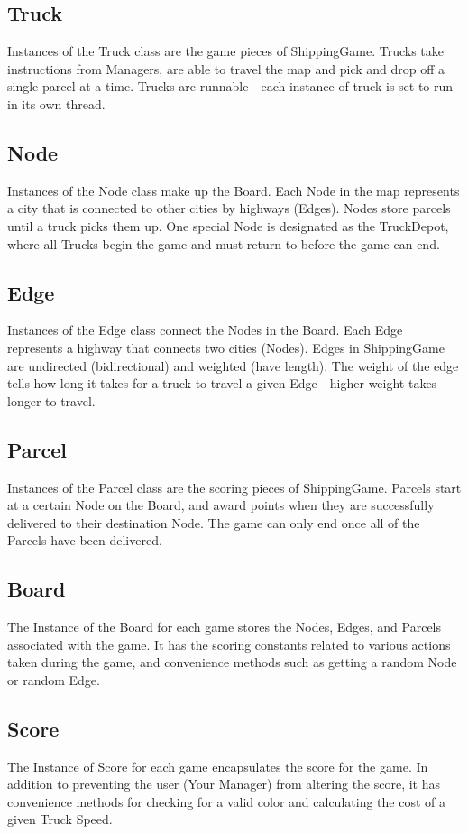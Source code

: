 \documentclass[11pt]{article}
\begin{document}
\subsection{Truck}
Instances of the Truck class are the game pieces of ShippingGame. Trucks take instructions from Managers, are able to travel the map and pick and drop off a single parcel at a time. Trucks are runnable - each instance of truck is set to run in its own thread.
\subsection{Node}
Instances of the Node class make up the Board. Each Node in the map represents a city that is connected to other cities by highways (Edges). Nodes store parcels until a truck picks them up. One special Node is designated as the TruckDepot, where all Trucks begin the game and must return to before the game can end.
\subsection{Edge}
Instances of the Edge class connect the Nodes in the Board. Each Edge represents a highway that connects two cities (Nodes). Edges in ShippingGame are undirected (bidirectional) and weighted (have length). The weight of the edge tells how long it takes for a truck to travel a given Edge - higher weight takes longer to travel.
\subsection{Parcel}
Instances of the Parcel class are the scoring pieces of ShippingGame. Parcels start at a certain Node on the Board, and award points when they are successfully delivered to their destination Node. The game can only end once all of the Parcels have been delivered.
\subsection{Board}
The Instance of the Board for each game stores the Nodes, Edges, and Parcels associated with the game. It has the scoring constants related to various actions taken during the game, and convenience methods such as getting a random Node or random Edge.
\subsection{Score}
The Instance of Score for each game encapsulates the score for the game. In addition to preventing the user (Your Manager) from altering the score, it has convenience methods for checking for a valid color and calculating the cost of a given Truck Speed.
\end{document}
